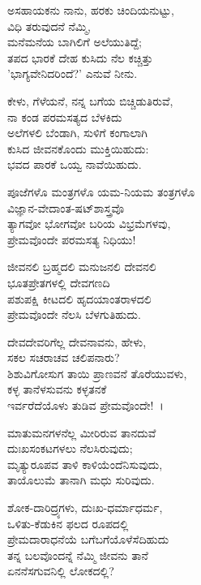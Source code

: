 \begin{myquote}
ಅಸಹಾಯಕನು ನಾನು, ಹರಕು ಚಿಂದಿಯನುಟ್ಟು,\\ವಿಧಿ ತರುವುದನೆ ನೆಮ್ಮಿ,\\ಮನೆಮನೆಯ ಬಾಗಿಲಿಗೆ ಅಲೆಯುತಿದ್ದೆ;\\ತಪದ ಭಾರಕೆ ದೇಹ ಕುಸಿದು ನೆಲ ಕಚ್ಚಿತ್ತು\\'ಭಾಗ್ಯವೇನಿದರಿಂದೆ?' ಎನುವೆ ನೀನು.
\end{myquote}

\begin{myquote}
ಕೇಳು, ಗೆಳೆಯನೆ, ನನ್ನ ಬಗೆಯ ಬಿಚ್ಚಿಡುತಿರುವೆ,\\ನಾ ಕಂಡ ಪರಮಸತ್ಯದ ಬೆಳಕಿದು\\ಅಲೆಗಳಲಿ ಬೆಂಡಾಗಿ, ಸುಳಿಗೆ ಕಂಗಾಲಾಗಿ\\ಕುಸಿದ ಜೀವನಕೊಂದು ಮುಕ್ತಿಯಿಹುದು:\\ಭವದ ಪಾರಕೆ ಒಯ್ವ ನಾವೆಯಿಹುದು.
\end{myquote}

\begin{myquote}
ಪೂಜೆಗಳೊ ಮಂತ್ರಗಳೊ ಯಮ-ನಿಯಮ ತಂತ್ರಗಳೊ\\ವಿಜ್ಞಾನ-ವೇದಾಂತ-ಷಟ್‌ಶಾಸ್ತ್ರವೊ\\ತ್ಯಾಗವೋ ಭೋಗವೋ ಬರಿಯ ವಿಭ್ರಮೆಗಳವು,\\ಪ್ರೇಮವೊಂದೇ ಪರಮಸತ್ಯ ನಿಧಿಯು!
\end{myquote}

\begin{myquote}
ಜೀವನಲಿ ಬ್ರಹ್ಮದಲಿ ಮನುಜನಲಿ ದೇವನಲಿ\\ಭೂತಪ್ರೇತಗಳಲ್ಲಿ ದೇವಗಣದಿ\\ಪಶುಪಕ್ಷಿ ಕೀಟದಲಿ ಹೃದಯಾಂತರಾಳದಲಿ\\
 ಪ್ರೇಮವೊಂದೇ ನೆಲಸಿ ಬೆಳಗುತಿಹುದು.
\end{myquote}

\begin{myquote}
ದೇವದೇವರಿಗೆಲ್ಲ ದೇವನಾವನು, ಹೇಳು,\\ಸಕಲ ಸಚರಾಚವ ಚಲಿಪನಾರು?\\ಶಿಶುವಿಗೋಸುಗ ತಾಯಿ ಪ್ರಾಣವನೆ ತೊರೆಯುವಳು,\\ಕಳ್ಳ ತಾನೆಳಸುವನು ಕಳ್ಳತನಕೆ\\ಇರ್ವರೆದೆಯೊಳು ತುಡಿವ ಪ್ರೇಮವೊಂದೇ!~।
\end{myquote}

\begin{myquote}
ಮಾತುಮನಗಳನೆಲ್ಲ ಮೀರಿರುವ ತಾನದುವೆ\\ದುಃಖಸಂಕಟಗಳಲು ನೆಲಸಿರುವುದು;\\ಮೃತ್ಯುರೂಪವ ತಾಳಿ ಕಾಳಿಯೆಂದೆನಿಸುವುದು,\\ತಾಯೊಲುಮೆ ತಾನಾಗಿ ಮಧು ಸುರಿವುದು.
\end{myquote}

\begin{myquote}
ಶೋಕ-ದಾರಿದ್ರ್ಯಗಳು, ದುಃಖ-ಧರ್ಮಾಧರ್ಮ,\\ಒಳಿತು-ಕೆಡುಕಿನ ಫಲದ ರೂಪದಲ್ಲಿ\\ಪ್ರೇಮದಾರಾಧನೆಯೆ ಬಗೆಬಗೆಯೊಳೆಸೆದಿಹುದು\\ತನ್ನ ಬಲವೊಂದನ್ನೆ ನೆಮ್ಮಿ ಜೀವನು ತಾನೆ\\ಏನನೆಸಗುವನಿಲ್ಲಿ ಲೋಕದಲ್ಲಿ?
\end{myquote}

